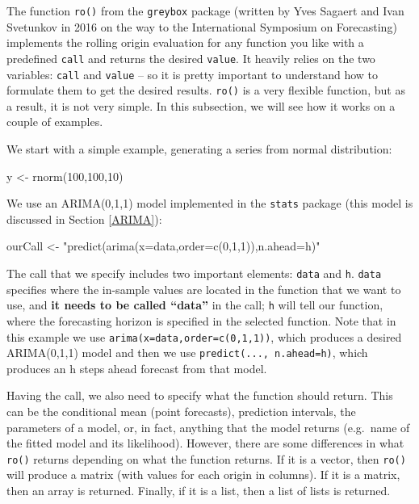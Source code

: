 \documentclass[
]{book}
\newenvironment{Shaded}{\begin{snugshade}}{\end{snugshade}}
\newcommand{\DecValTok}[1]{\textcolor[rgb]{0.00,0.00,0.81}{#1}}
\newcommand{\FunctionTok}[1]{\textcolor[rgb]{0.00,0.00,0.00}{#1}}
\newcommand{\NormalTok}[1]{#1}
\newcommand{\OtherTok}[1]{\textcolor[rgb]{0.56,0.35,0.01}{#1}}
\newcommand{\StringTok}[1]{\textcolor[rgb]{0.31,0.60,0.02}{#1}}
\theoremstyle{definition}
\theoremstyle{definition}
\theoremstyle{definition}
\theoremstyle{definition}
\theoremstyle{remark}
\begin{document}
The function \texttt{ro()} from the \texttt{greybox} package (written by Yves Sagaert and Ivan Svetunkov in 2016 on the way to the International Symposium on Forecasting) implements the rolling origin evaluation for any function you like with a predefined \texttt{call} and returns the desired \texttt{value}. It heavily relies on the two variables: \texttt{call} and \texttt{value} -- so it is pretty important to understand how to formulate them to get the desired results. \texttt{ro()} is a very flexible function, but as a result, it is not very simple. In this subsection, we will see how it works on a couple of examples.

We start with a simple example, generating a series from normal distribution:

\begin{Shaded}
\begin{Highlighting}[]
\NormalTok{y }\OtherTok{\textless{}{-}} \FunctionTok{rnorm}\NormalTok{(}\DecValTok{100}\NormalTok{,}\DecValTok{100}\NormalTok{,}\DecValTok{10}\NormalTok{)}
\end{Highlighting}
\end{Shaded}

We use an ARIMA(0,1,1) model implemented in the \texttt{stats} package (this model is discussed in Section \ref{ARIMA}):

\begin{Shaded}
\begin{Highlighting}[]
\NormalTok{ourCall }\OtherTok{\textless{}{-}} \StringTok{"predict(arima(x=data,order=c(0,1,1)),n.ahead=h)"}
\end{Highlighting}
\end{Shaded}

The call that we specify includes two important elements: \texttt{data} and \texttt{h}. \texttt{data} specifies where the in-sample values are located in the function that we want to use, and \textbf{it needs to be called ``data''} in the call; \texttt{h} will tell our function, where the forecasting horizon is specified in the selected function. Note that in this example we use \texttt{arima(x=data,order=c(0,1,1))}, which produces a desired ARIMA(0,1,1) model and then we use \texttt{predict(...,\ n.ahead=h)}, which produces an h steps ahead forecast from that model.

Having the call, we also need to specify what the function should return. This can be the conditional mean (point forecasts), prediction intervals, the parameters of a model, or, in fact, anything that the model returns (e.g.~name of the fitted model and its likelihood). However, there are some differences in what \texttt{ro()} returns depending on what the function returns. If it is a vector, then \texttt{ro()} will produce a matrix (with values for each origin in columns). If it is a matrix, then an array is returned. Finally, if it is a list, then a list of lists is returned.
\end{document}
